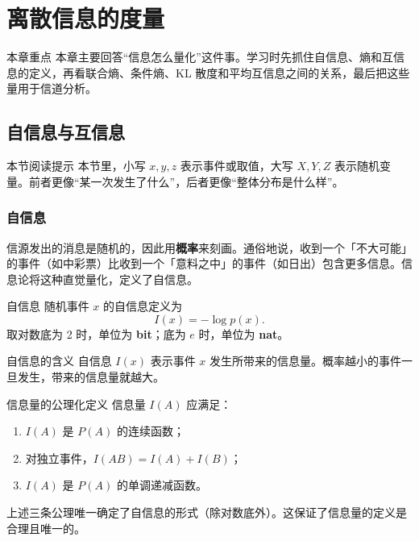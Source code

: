 \section{离散信息的度量}

\begin{remarkBox}{本章重点}
本章主要回答“信息怎么量化”这件事。学习时先抓住自信息、熵和互信息的定义，再看联合熵、条件熵、KL 散度和平均互信息之间的关系，最后把这些量用于信道分析。
\end{remarkBox}

\subsection{自信息与互信息}

\begin{remarkBox}{本节阅读提示}
本节里，小写 $x,y,z$ 表示事件或取值，大写 $X,Y,Z$ 表示随机变量。前者更像“某一次发生了什么”，后者更像“整体分布是什么样”。
\end{remarkBox}

\subsubsection{自信息}
信源发出的消息是随机的，因此用\textbf{概率}来刻画。通俗地说，收到一个「不大可能」的事件（如中彩票）比收到一个「意料之中」的事件（如日出）包含更多信息。信息论将这种直觉量化，定义了自信息。

\begin{definitionBox}{自信息}
随机事件 $x$ 的自信息定义为
\[
I(x) = -\log p(x).
\]
取对数底为 2 时，单位为 \textbf{bit}；底为 $e$ 时，单位为 \textbf{nat}。
\end{definitionBox}

\begin{keypoint}{自信息的含义}
自信息 $I(x)$ 表示事件 $x$ 发生所带来的信息量。概率越小的事件一旦发生，带来的信息量就越大。
\end{keypoint}

\begin{definitionBox}{信息量的公理化定义}
信息量 $I(A)$ 应满足：
\begin{enumerate}
  \item $I(A)$ 是 $P(A)$ 的连续函数；
  \item 对独立事件，$I(A B)=I(A)+I(B)$；
  \item $I(A)$ 是 $P(A)$ 的单调递减函数。
\end{enumerate}
\end{definitionBox}

上述三条公理唯一确定了自信息的形式（除对数底外）。这保证了信息量的定义是合理且唯一的。

